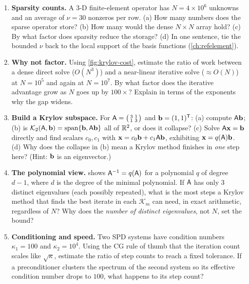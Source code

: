 \exercisessection
\begin{enumerate}[nosep]
  \item \textbf{Sparsity counts.} A 3-D finite-element operator has $N=4\times10^6$
  unknowns and an average of $\nu=30$ nonzeros per row. (a) How many numbers does the
  sparse operator store? (b) How many would the dense $N\times N$ array hold? (c) By
  what factor does sparsity reduce the storage? (d) In one sentence, tie the bounded
  $\nu$ back to the local support of the basis functions (\cref{ch:refelement}).
  \item \textbf{Why not factor.} Using \cref{fig:krylov-cost}, estimate the ratio of
  work between a dense direct solve ($O(N^3)$) and a near-linear iterative solve
  ($\approx O(N)$) at $N=10^5$ and again at $N=10^7$. By what factor does the
  iterative advantage grow as $N$ goes up by $100\times$? Explain in terms of the
  exponents why the gap widens.
  \item \textbf{Build a Krylov subspace.} For
  $\mathsf{A}=\bigl(\begin{smallmatrix}3&1\\1&3\end{smallmatrix}\bigr)$ and
  $\mathbf{b}=(1,1)^{\mathsf T}$: (a) compute $\mathsf{A}\mathbf{b}$; (b) is $\mathcal{K}_2(\mathsf{A},\mathbf{b})
  =\operatorname{span}\{\mathbf{b},\mathsf{A}\mathbf{b}\}$ all of $\mathbb{R}^2$, or does it collapse?
  (c) Solve $\mathsf{A}\mathbf{x}=\mathbf{b}$ directly and find scalars $c_0,c_1$ with
  $\mathbf{x}=c_0\mathbf{b}+c_1\mathsf{A}\mathbf{b}$, exhibiting $\mathbf{x}=q(\mathsf{A})\mathbf{b}$. (d) Why does the collapse
  in (b) mean a Krylov method finishes in \emph{one} step here? (Hint: $\mathbf{b}$ is an
  eigenvector.)
  \item \textbf{The polynomial view.}  shows
  $\mathsf{A}^{-1}=q(\mathsf{A})$ for a polynomial $q$ of degree $d-1$, where $d$ is the
  degree of the minimal polynomial. If $\mathsf{A}$ has only $3$ distinct eigenvalues
  (each possibly repeated), what is the most steps a Krylov method that finds the best
  iterate in each $\mathcal{K}_m$ can need, in exact arithmetic, regardless of $N$?
  Why does the \emph{number of distinct eigenvalues}, not $N$, set the bound?
  \item \textbf{Conditioning and speed.} Two SPD systems have condition numbers
  $\kappa_1=100$ and $\kappa_2=10^4$. Using the CG rule of thumb that the iteration
  count scales like $\sqrt{\kappa}$, estimate the ratio of step counts to reach a
  fixed tolerance. If a preconditioner clusters the spectrum of the second system so
  its effective condition number drops to $100$, what happens to its step count?

\end{enumerate}
